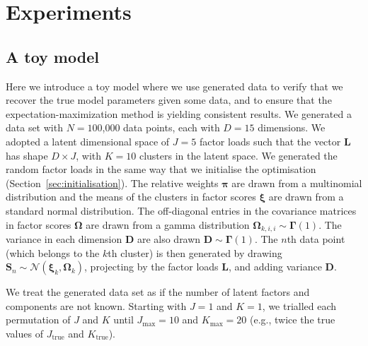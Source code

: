 \documentclass[twocolumn]{aastex62}
\newcommand{\vect}[1]{\boldsymbol{\mathbf{#1}}}
\renewcommand{\vec}[1]{\vect{#1}}
\newcommand{\weight}{\pi}
\newcommand{\factorloads}{\textbf{L}}
\newcommand{\factorscores}{\textbf{S}}
\newcommand{\specificvariance}{\vec{D}}
\newcommand{\scoremeans}{\vec\xi}
\newcommand{\scorecovs}{\vec\Omega}
\newcommand{\NumData}{N}
\newcommand{\NumDimensions}{D}
\newcommand{\numdata}{n}
\newcommand{\NumLatentFactors}{J}
\newcommand{\NumComponents}{K}
\newcommand{\numcomponents}{k}
\begin{document}
\section{Experiments} \label{sec:experiments}


\subsection{A toy model} \label{sec:exp-1}

Here we introduce a toy model where we use generated data to verify that
we recover the true model parameters given some data, and to
ensure that the expectation-maximization method is yielding consistent results.
We generated a data set with ${\NumData = 1}$00,000 data points, each with
$\NumDimensions = 15$ dimensions. We adopted a latent dimensional space of 
$\NumLatentFactors = 5$ factor loads such that the vector $\factorloads$ has
shape $\NumDimensions \times \NumLatentFactors$,
with $\NumComponents = 10$ clusters in the latent space. 
We generated the random factor loads in the same way that we initialise the optimisation (Section~\ref{sec:initialisation}). The relative weights $\vec\weight$
are drawn from a multinomial distribution and the means of the clusters
in factor scores $\scoremeans$ are drawn from a standard normal
distribution. The off-diagonal entries in the covariance matrices in factor scores $\scorecovs$ are drawn from a gamma distribution $\scorecovs_{\numcomponents,i,i} \sim \vec\Gamma\left(1\right)$. The variance in 
each dimension $\specificvariance$ are also drawn $\specificvariance \sim \vec\Gamma\left(1\right)$.
The $\numdata$th data point (which belongs to the $\numcomponents$th cluster) is then
generated by drawing $\factorscores_{\numdata} \sim \mathcal{N}(\scoremeans_\numcomponents,\scorecovs_\numcomponents)$, projecting by the factor loads $\factorloads$, and adding variance $\specificvariance$.





We treat the generated data set as if the number of latent factors
and components are not known. Starting with $\NumLatentFactors = 1$
and $\NumComponents = 1$, we trialled each permutation of $\NumLatentFactors$ and $\NumComponents$
until $\NumLatentFactors_\textrm{max} = 10$
and   $\NumComponents_\textrm{max} = 20$ (e.g., twice the true values of $\NumLatentFactors_\textrm{true}$ and $\NumComponents_\textrm{true}$).
\end{document}
